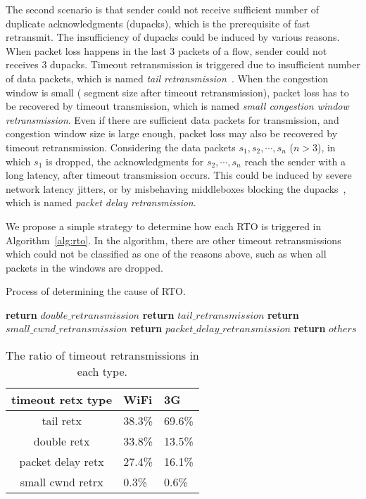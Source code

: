 The second scenario is that sender could not receive sufficient number of duplicate acknowledgments (dupacks), which is the prerequisite of fast retransmit. The insufficiency of dupacks could be induced by various reasons. When packet loss happens in the last 3 packets of a flow, sender could not receives 3 dupacks. Timeout retransmission is triggered due to insufficient number of data packets, which is named \emph{tail retransmission}~\cite{flach2013reducing}. When the congestion window is small ( segment size after timeout retransmission), packet loss has to be recovered by timeout transmission, which is named \emph{small congestion window retransmission}. Even if there are sufficient data packets for transmission, and congestion window size is large enough, packet loss may also be recovered by timeout retransmission. Considering the data packets $s_1, s_2, \cdots, s_n$ ($n > 3$), in which $s_1$ is dropped, the acknowledgments for $s_2, \cdots, s_n$ reach the sender with a long latency, after timeout transmission occurs. This could be induced by severe network latency jitters, or by misbehaving middleboxes blocking the dupacks~\cite{honda2011isit}, which is named \emph{packet delay retransmission}.

We propose a simple strategy to determine how each RTO is triggered in Algorithm~\ref{alg:rto}. In the algorithm, there are other timeout retransmissions which could not be classified as one of the reasons above, such as when all packets in the windows are dropped. 

\begin{algorithm}
	\caption{Process of determining the cause of RTO.}
	\label{alg:rto}
	\begin{algorithmic}[1]
				\State \textbf{return} $double\_retransmission$
				\State \textbf{return} $tail\_retransmission$
				\State \textbf{return} $small\_cwnd\_retransmission$
				\State \textbf{return} $packet\_delay\_retransmission$
			\Else
				\State \textbf{return} $others$
			\EndIf
		\EndProcedure
	\end{algorithmic}
\end{algorithm}

\begin{table}[th]
\caption{The ratio of timeout retransmissions in each type.}
\label{tab:rto_type}
\centering
\renewcommand{\arraystretch}{1.0}
\begin{tabular}{c|C{1.1cm}|C{1.1cm}}
	\hline
	\textbf{timeout retx type} & WiFi & 3G \\
	\hline
	tail retx & 38.3\% & 69.6\% \\
	\hline
	double retx & 33.8\% & 13.5\% \\
	\hline
	packet delay retx & 27.4\% & 16.1\% \\
	\hline
	small cwnd retrx & 0.3\% & 0.6\% \\
	\hline
\end{tabular}
\end{table}

